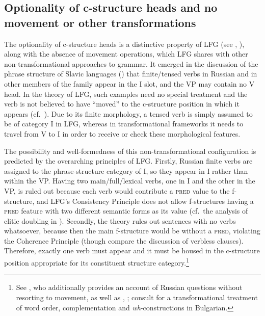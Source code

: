\documentclass[output=paper,hidelinks]{langscibook}
\begin{document}
\largerpage
\subsection{Optionality of c-structure heads and no movement or other transformations}
\label{sec:Slavic:3.1}

The optionality of c-structure heads is a distinctive property of LFG (see \citealt{lovestrand-lowe2017}, \citealt{low:lov:20}), along with the absence of movement operations, which LFG shares with other non-transformational approaches to grammar. It emerged in the discussion of the phrase structure of Slavic languages () that finite/tensed verbs in Russian and in other members of the family appear in the I slot, and the VP may contain no V head. In the theory of LFG, such examples need no special treatment and the verb is not believed to have ``moved'' to the c-structure position in which it appears (cf.\ ).   Due to its finite morphology, a tensed verb is simply assumed to be of category I in LFG, whereas in transformational frameworks it needs to travel from V to I in order to receive or check these morphological features. 

The possibility and well-formedness of this non-transformational configuration is predicted by the overarching principles of LFG. Firstly, Russian finite verbs are assigned to the phrase-structure category of I, so they appear in I rather than within the VP. Having two main/full/lexical verbs, one in I and the other in the VP, is ruled out because each verb would contribute a \textsc{pred} value to the f-structure, and LFG's Consistency Principle does not allow f-structures having a \textsc{pred} feature with two different semantic forms as its value (cf.\ the analysis of clitic doubling in ). Secondly, the theory rules out sentences with no verbs whatsoever, because then the main f-structure would be without a \textsc{pred}, violating the Coherence Principle (though compare the discussion of verbless clauses). Therefore, exactly one verb must appear and it must be housed in the c-structure position appropriate for its constituent structure category.\footnote{See \citet[Chapter~10]{King95}, who additionally provides an account of Russian questions without resorting to movement, as well as \citet[79, 104--106]{dalrymple01}, \citet[129--130]{DLM:LFG}; consult \citet{Rudin1985} for a transformational treatment of word order, complementation and \textit{wh}-constructions in Bulgarian.}
\end{document}
